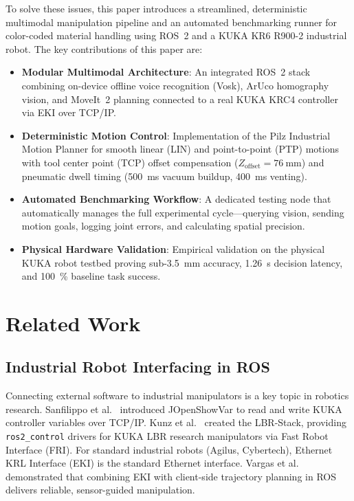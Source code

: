 \documentclass[runningheads]{llncs}
\begin{document}
To solve these issues, this paper introduces a streamlined, deterministic multimodal manipulation pipeline and an automated benchmarking runner for color-coded material handling using ROS~2 and a KUKA KR6 R900-2 industrial robot. The key contributions of this paper are:
\begin{itemize}
    \item \textbf{Modular Multimodal Architecture}: An integrated ROS~2 stack combining on-device offline voice recognition (Vosk), ArUco homography vision, and MoveIt~2 planning connected to a real KUKA KRC4 controller via EKI over TCP/IP.
    \item \textbf{Deterministic Motion Control}: Implementation of the Pilz Industrial Motion Planner for smooth linear (LIN) and point-to-point (PTP) motions with tool center point (TCP) offset compensation ($Z_{\text{offset}} = \SI{76}{\milli\meter}$) and pneumatic dwell timing (\SI{500}{\milli\second} vacuum buildup, \SI{400}{\milli\second} venting).
    \item \textbf{Automated Benchmarking Workflow}: A dedicated testing node that automatically manages the full experimental cycle—querying vision, sending motion goals, logging joint errors, and calculating spatial precision.
    \item \textbf{Physical Hardware Validation}: Empirical validation on the physical KUKA robot testbed proving sub-\SI{3.5}{\milli\meter} accuracy, \SI{1.26}{\second} decision latency, and \SI{100}{\percent} baseline task success.
\end{itemize}

\section{Related Work}
\label{sec:related_work}

\subsection{Industrial Robot Interfacing in ROS}
Connecting external software to industrial manipulators is a key topic in robotics research. Sanfilippo et al.~\cite{jopenshowvar2015} introduced JOpenShowVar to read and write KUKA controller variables over TCP/IP. Kunz et al.~\cite{lbr_stack2024} created the LBR-Stack, providing \texttt{ros2\_control} drivers for KUKA LBR research manipulators via Fast Robot Interface (FRI). For standard industrial robots (Agilus, Cybertech), Ethernet KRL Interface (EKI) is the standard Ethernet interface. Vargas et al.~\cite{kuka_eki_eval2022} demonstrated that combining EKI with client-side trajectory planning in ROS delivers reliable, sensor-guided manipulation.
\end{document}
